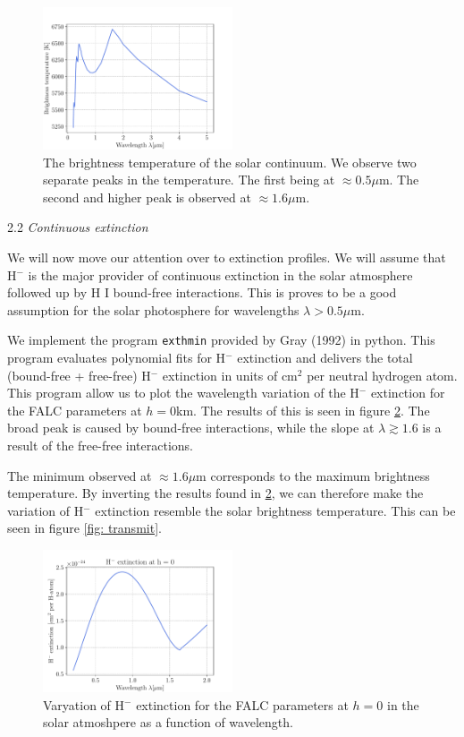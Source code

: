 \documentclass[a4paper,11.5pt,]{article}
\begin{document}
\begin{multicols}{2}
\begin{figure}[H]
    \centering
    \includegraphics[width = 0.5\textwidth]{figures/2.1/solarcontinuum_brighttemp.pdf}
    \caption{The brightness temperature of the solar continuum. We observe two separate peaks in the temperature. The first being at $\approx 0.5 \mu$m. The second and higher peak is observed at $\approx 1.6 \mu$m.}
    \label{fig: bright}
\end{figure}

\begin{center}
2.2 \textit{Continuous extinction}
\end{center}

We will now move our attention over to extinction profiles. We will assume that H$^-$ is the major provider of continuous extinction in the solar atmosphere followed up by H I bound-free interactions. This is proves to be a good assumption for the solar photosphere for wavelengths $\lambda > 0.5 \mu$m. 

We implement the program \texttt{exthmin} provided by Gray (1992) in python. This program evaluates polynomial fits for H$^-$ extinction and delivers the total (bound-free + free-free) H$^-$ extinction in units of cm$^2$ per neutral hydrogen atom. This program allow us to plot the wavelength variation of the H$^-$ extinction for the FALC parameters at $h = 0$km. The results of this is seen in figure \ref{fig: H0}. The broad peak is caused by bound-free interactions, while the slope at $\lambda \gtrsim 1.6$ is a result of the free-free interactions.

The minimum observed at $\approx 1.6 \mu$m corresponds to the maximum brightness temperature. By inverting the results found in \ref{fig: H0}, we can therefore make the variation of H$^-$ extinction resemble the solar brightness temperature. This can be seen in figure \ref{fig: transmit}.


\begin{figure}[H]
    \centering
    \includegraphics[width = 0.5\textwidth]{figures/2.2/extinction_H0.pdf}
    \caption{Varyation of H$^-$ extinction for the FALC parameters at $h=0$ in the solar atmoshpere as a function of wavelength.}
    \label{fig: H0}
\end{figure}


\end{multicols}
\end{document}
